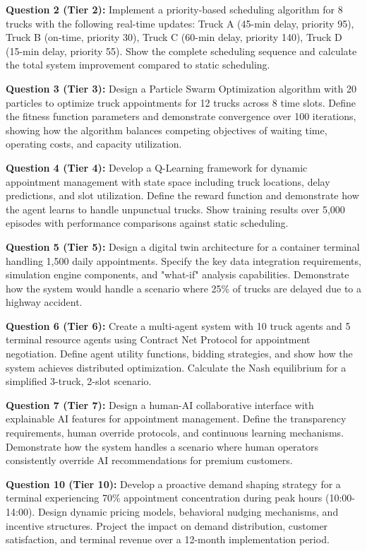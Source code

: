 \documentclass{article}
\begin{document}
\textbf{Question 2 (Tier 2):} Implement a priority-based scheduling algorithm for 8 trucks with the following real-time updates: Truck A (45-min delay, priority 95), Truck B (on-time, priority 30), Truck C (60-min delay, priority 140), Truck D (15-min delay, priority 55). Show the complete scheduling sequence and calculate the total system improvement compared to static scheduling.

\textbf{Question 3 (Tier 3):} Design a Particle Swarm Optimization algorithm with 20 particles to optimize truck appointments for 12 trucks across 8 time slots. Define the fitness function parameters and demonstrate convergence over 100 iterations, showing how the algorithm balances competing objectives of waiting time, operating costs, and capacity utilization.

\textbf{Question 4 (Tier 4):} Develop a Q-Learning framework for dynamic appointment management with state space including truck locations, delay predictions, and slot utilization. Define the reward function and demonstrate how the agent learns to handle unpunctual trucks. Show training results over 5,000 episodes with performance comparisons against static scheduling.

\textbf{Question 5 (Tier 5):} Design a digital twin architecture for a container terminal handling 1,500 daily appointments. Specify the key data integration requirements, simulation engine components, and "what-if" analysis capabilities. Demonstrate how the system would handle a scenario where 25\% of trucks are delayed due to a highway accident.

\textbf{Question 6 (Tier 6):} Create a multi-agent system with 10 truck agents and 5 terminal resource agents using Contract Net Protocol for appointment negotiation. Define agent utility functions, bidding strategies, and show how the system achieves distributed optimization. Calculate the Nash equilibrium for a simplified 3-truck, 2-slot scenario.

\textbf{Question 7 (Tier 7):} Design a human-AI collaborative interface with explainable AI features for appointment management. Define the transparency requirements, human override protocols, and continuous learning mechanisms. Demonstrate how the system handles a scenario where human operators consistently override AI recommendations for premium customers.

\textbf{Question 10 (Tier 10):} Develop a proactive demand shaping strategy for a terminal experiencing 70\% appointment concentration during peak hours (10:00-14:00). Design dynamic pricing models, behavioral nudging mechanisms, and incentive structures. Project the impact on demand distribution, customer satisfaction, and terminal revenue over a 12-month implementation period.
\end{document}
